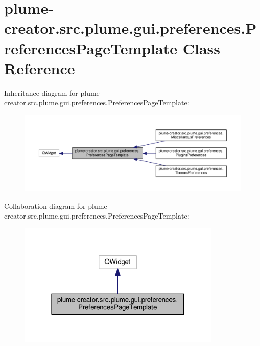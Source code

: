 \hypertarget{classplume-creator_1_1src_1_1plume_1_1gui_1_1preferences_1_1_preferences_page_template}{}\section{plume-\/creator.src.\+plume.\+gui.\+preferences.\+Preferences\+Page\+Template Class Reference}
\label{classplume-creator_1_1src_1_1plume_1_1gui_1_1preferences_1_1_preferences_page_template}


Inheritance diagram for plume-\/creator.src.\+plume.\+gui.\+preferences.\+Preferences\+Page\+Template\+:\nopagebreak
\begin{figure}[H]
\begin{center}
\leavevmode
\includegraphics[width=350pt]{classplume-creator_1_1src_1_1plume_1_1gui_1_1preferences_1_1_preferences_page_template__inherit__graph}
\end{center}
\end{figure}


Collaboration diagram for plume-\/creator.src.\+plume.\+gui.\+preferences.\+Preferences\+Page\+Template\+:\nopagebreak
\begin{figure}[H]
\begin{center}
\leavevmode
\includegraphics[width=274pt]{classplume-creator_1_1src_1_1plume_1_1gui_1_1preferences_1_1_preferences_page_template__coll__graph}
\end{center}
\end{figure}
